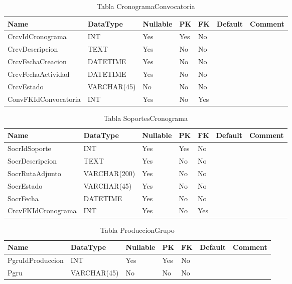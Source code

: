\begin{table}
	\caption{Tabla CronogramaConvocatoria}
	\label{labelTableCronogramaConvocatoria}
	\begin{tabular}{ |l|l|l|l|l|l|l| }
		\hline
		Name & DataType & Nullable & PK & FK & Default & Comment \\ \hline
		CrcvIdCronograma & INT & Yes & Yes & No &  & \\ \hline 
		CrcvDescripcion & TEXT & Yes & No & No &  & \\ \hline 
		CrcvFechaCreacion & DATETIME & Yes & No & No &  & \\ \hline 
		CrcvFechaActividad & DATETIME & Yes & No & No &  & \\ \hline 
		CrcvEstado & VARCHAR(45) & No & No & No &  & \\ \hline 
		ConvFKIdConvocatoria & INT & Yes & No & Yes &  & \\ \hline 
		
	\end{tabular}
\end{table}


\begin{table}
	\caption{Tabla SoportesCronograma}
	\label{labelTableSoportesCronograma}
	\begin{tabular}{ |l|l|l|l|l|l|l| }
		\hline
		Name & DataType & Nullable & PK & FK & Default & Comment \\ \hline
		SocrIdSoporte & INT & Yes & Yes & No &  & \\ \hline 
		SocrDescripcion & TEXT & Yes & No & No &  & \\ \hline 
		SocrRutaAdjunto & VARCHAR(200) & Yes & No & No &  & \\ \hline 
		SocrEstado & VARCHAR(45) & Yes & No & No &  & \\ \hline 
		SocrFecha & DATETIME & Yes & No & No &  & \\ \hline 
		CrcvFKIdCronograma & INT & Yes & No & Yes &  & \\ \hline 
		
	\end{tabular}
\end{table}

\begin{table}
	\caption{Tabla ProduccionGrupo}
	\label{labelTableProduccionGrupo}
	\begin{tabular}{ |l|l|l|l|l|l|l| }
		\hline
		Name & DataType & Nullable & PK & FK & Default & Comment \\ \hline
		PgruIdProduccion & INT & Yes & Yes & No &  & \\ \hline 
		Pgru & VARCHAR(45) & No & No & No &  & \\ \hline 
		
	\end{tabular}
\end{table}

